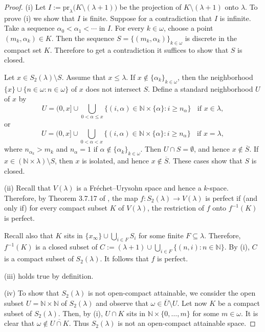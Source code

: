 \documentclass[preprint,11pt]{elsarticle}
\numberwithin{equation}{section}
\numberwithin{theorem}{section}
\newcommand{\w}{\omega}
\newcommand{\NN}{\mathbb{N}}
\newcommand{\pr}{\mathrm{pr}}
\newcommand{\SM}{{\setminus}}
\begin{document}
\begin{proof}
(i) Let $I:=\pr_{\lambda} \big(K\SM (\lambda+1)\big)$ be the projection of $K\SM (\lambda+1)$ onto  $\lambda$. To prove (i) we show that $I$ is finite. Suppose for a contradiction that $I$ is infinite. Take a sequence $\alpha_0<\alpha_1<\cdots$ in $I$. For every $k\in\w$, choose a point $(m_k,\alpha_k)\in K$. Then the sequence $S=\{(m_k,\alpha_k)\}_{k\in\w}$ is discrete in the compact set $K$. Therefore to get a contradiction it suffices to show that $S$ is closed.

Let $x\in S_2(\lambda)\SM S$. Assume that $x\leq\lambda$. If $x\not\in \{\alpha_k\}_{k\in\w}$, then the neighborhood $\{x\}\cup\{n\in\w: n\in\w\}$ of $x$ does not intersect $S$. Define a standard neighborhood $U$ of $x$ by
\[
U=(0,x]\cup \bigcup_{0<\alpha\leq x} \big\{(i,\alpha)\in\NN\times\{\alpha\}: i\geq n_\alpha\big\}\;\; \mbox{ if $x\in\lambda$},
\]
or
\[
U=(0,x]\cup \bigcup_{0<\alpha< x} \big\{(i,\alpha)\in\NN\times\{\alpha\}: i\geq n_\alpha\big\}\;\; \mbox{ if $x=\lambda$},
\]
where $n_{\alpha_k}>m_k$ and $n_\alpha=1$ if $\alpha\not\in \{\alpha_k\}_{k\in\w}$. Then $U\cap S=\emptyset$, and hence $x\not\in \overline{S}$.
If $x\in (\NN\times \lambda)\SM S$, then $x$ is isolated, and hence $x\not\in \overline{S}$. These cases show that $S$ is closed.
\smallskip

(ii) Recall that $V(\lambda)$ is a Fr\'{e}chet--Urysohn space and hence a $k$-space. Therefore, by Theorem 3.7.17 of \cite{Eng}, the map $f:S_2(\lambda)\to V(\lambda)$ is perfect if (and only if) for every compact subset $K$ of  $V(\lambda)$, the restriction of $f$ onto $f^{-1}(K)$ is perfect.

Recall also that $K$ sits in $\{x_\infty\} \cup \bigcup_{i\in F} S_i$ for some finite $F\subseteq \lambda$. Therefore,   $f^{-1}(K)$ is a closed subset of $C:=(\lambda+1) \cup \bigcup_{i\in F} \{ (n,i): n\in\NN\}$. By (i), $C$ is a compact subset of $S_2(\lambda)$. It follows that $f$ is perfect.
\smallskip


(iii) holds true by definition.
\smallskip


(iv) To show that  $S_2(\lambda)$  is not open-compact attainable, we consider the open subset  $U=\NN\times\NN$ of $S_2(\lambda)$  and observe that $\w\in \overline{U}\SM U$. Let now $K$ be a compact subset of $S_2(\lambda)$. Then, by (i),  $U\cap K$ sits in $\NN\times \{0,\dots,m\}$ for some $m\in\w$. It is clear that $\w\not\in \overline{U\cap K}$. Thus $S_2(\lambda)$ is not an open-compact attainable space.
\smallskip



\end{proof}
\end{document}
